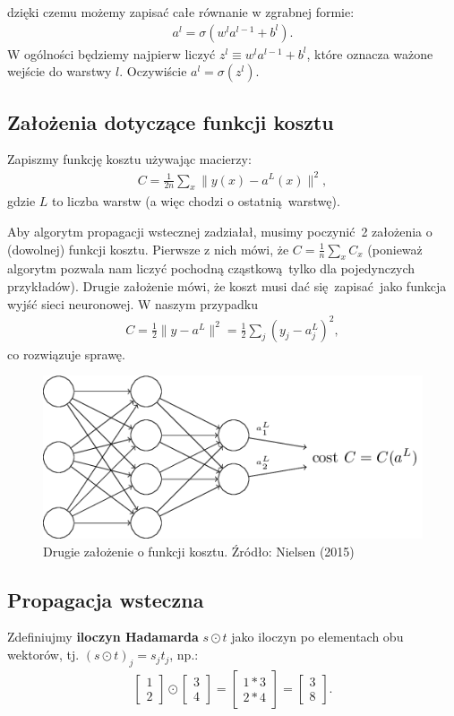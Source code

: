 \documentclass[10pt, oneside]{article}
\theoremstyle{remark}
\begin{document}
dzięki czemu możemy zapisać całe równanie w zgrabnej formie:
\begin{eqnarray} 
  a^{l} = \sigma(w^l a^{l-1}+b^l).
\end{eqnarray}
W ogólności będziemy najpierw liczyć $z^l \equiv w^l a^{l-1}+b^l$, które oznacza ważone wejście do warstwy $l$. Oczywiście $a^l =
\sigma(z^l)$.

\subsection{Założenia dotyczące funkcji kosztu}
Zapiszmy funkcję kosztu używając macierzy:
\begin{eqnarray}
  C = \frac{1}{2n} \sum_x \|y(x)-a^L(x)\|^2,
\end{eqnarray}
gdzie $L$ to liczba warstw (a więc chodzi o ostatnią warstwę).

Aby algorytm propagacji wstecznej zadziałał, musimy poczynić 2 założenia o (dowolnej) funkcji kosztu. Pierwsze z nich mówi, że $C = \frac{1}{n} \sum_x C_x$ (ponieważ algorytm pozwala nam liczyć pochodną cząstkową tylko dla pojedynczych przykładów).
Drugie założenie mówi, że koszt musi dać się zapisać jako funkcja wyjść sieci neuronowej.
W naszym przypadku
\begin{eqnarray}
  C = \frac{1}{2} \|y-a^L\|^2 = \frac{1}{2} \sum_j (y_j-a^L_j)^2,
\end{eqnarray}
co rozwiązuje sprawę.
\begin{figure}[!htpb]
	\centering
	\includegraphics[width=.5\linewidth]{figures/tikz18}
	\caption{Drugie założenie o funkcji kosztu. Źródło: Nielsen (2015)}
\end{figure}

\subsection{Propagacja wsteczna}

Zdefiniujmy \textbf{iloczyn Hadamarda} $s \odot t$ jako iloczyn po elementach obu wektorów, tj. $(s \odot t)_j = s_j t_j$, np.:
\begin{eqnarray}
\left[\begin{array}{c} 1 \\ 2 \end{array}\right] 
  \odot \left[\begin{array}{c} 3 \\ 4\end{array} \right]
= \left[ \begin{array}{c} 1 * 3 \\ 2 * 4 \end{array} \right]
= \left[ \begin{array}{c} 3 \\ 8 \end{array} \right].
\end{eqnarray}
\end{document}
